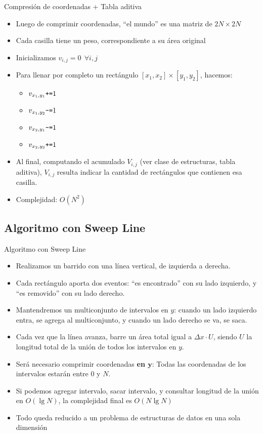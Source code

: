 \documentclass[compress]{beamer}
\begin{document}
\begin{frame}{Compresión de coordenadas + Tabla aditiva}
    \begin{itemize}
        \item Luego de comprimir coordenadas, ``el mundo'' es una matriz de $2N \times 2N$
        \item Cada casilla tiene un peso, correspondiente a su área original
        \item Inicializamos $v_{i,j} = 0  \ \ \forall i,j$
        \item Para llenar por completo un rectángulo $[x_1,x_2] \times [y_1,y_2]$, hacemos:
            \begin{itemize}
                \item $v_{x_1, y_1} \mbox{\texttt{+=}} 1$
                \item $v_{x_1, y_2} \mbox{\texttt{-=}} 1$
                \item $v_{x_2, y_1} \mbox{\texttt{-=}} 1$
                \item $v_{x_2, y_2} \mbox{\texttt{+=}} 1$
            \end{itemize}
        \item Al final, computando el acumulado $V_{i,j}$ (ver clase de estructuras, tabla aditiva), $V_{i,j}$ resulta indicar la cantidad de rectángulos que contienen esa casilla.
        \item Complejidad: $O(N^2)$
    \end{itemize}
\end{frame}


\subsection{Algoritmo con Sweep Line}

\begin{frame}{Algoritmo con Sweep Line}
    \begin{itemize}
        \item Realizamos un barrido con una línea vertical, de izquierda a derecha.
        \item Cada rectángulo aporta dos eventos: ``es encontrado'' con su lado izquierdo, y ``es removido'' con su lado derecho.
        \item Mantendremos un multiconjunto de intervalos en $y$: cuando un lado izquierdo entra, se agrega al multiconjunto, y cuando un lado derecho
                se va, se saca.
        \item Cada vez que la línea avanza, barre un área total igual a $\Delta x \cdot U$, siendo $U$ la longitud total de la unión de todos los intervalos en $y$.
        \item Será necesario comprimir coordenadas \textbf{en $\mathbf{y}$}: Todas las coordenadas de los intervalos estarán entre $0$ y $N$.
        \item Si podemos agregar intervalo, sacar intervalo, y consultar longitud de la unión en $O(\lg N)$, la complejidad final es $O(N\lg N)$
        \item Todo queda reducido a un problema de estructuras de datos en una sola dimensión
    \end{itemize}
\end{frame}
\end{document}
